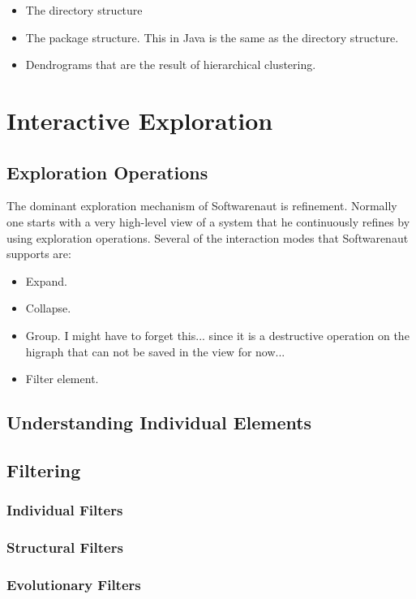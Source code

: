 \documentclass[preprint,12pt]{elsarticle}
\begin{document}
\begin{itemize}
\item The directory structure
\item The package structure. This in Java is the same as the directory structure.
\item Dendrograms that are the result of hierarchical clustering. 
\end{itemize}



\section {Interactive Exploration}
\subsection {Exploration Operations}
The dominant exploration mechanism of Softwarenaut is refinement. Normally 
one starts with a very high-level view of a system that he continuously refines
by using exploration operations. Several of the interaction modes that Softwarenaut
supports are: 

\begin{itemize}
\item Expand. 
\item Collapse. 
\item Group. I might have to forget this... since it is a destructive operation
on the higraph that can not be saved in the view for now... 
\item Filter element. 
\end{itemize}

\subsection {Understanding Individual Elements}
\subsection {Filtering}
\subsubsection {Individual Filters}
\subsubsection {Structural Filters}
\subsubsection {Evolutionary Filters}
\end{document}
